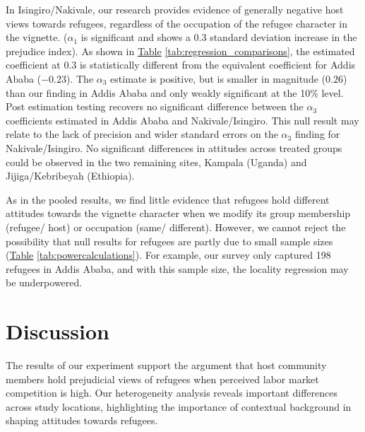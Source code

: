 \documentclass[a4paper,12pt]{article}
\begin{document}
In Isingiro/Nakivale, our research provides evidence of generally negative host views towards refugees, regardless of the occupation of the refugee character in the vignette. ($\alpha_{1}$ is significant and shows a $0.3$ standard deviation increase in the prejudice index). As shown in \hyperref[tab:regression_comparisons]{Table} \ref{tab:regression_comparisons}, the estimated coefficient at 0.3 is statistically different from the equivalent coefficient for Addis Ababa ($-0.23$). The $\alpha_{3}$ estimate is positive, but is smaller in magnitude ($0.26$) than our finding in Addis Ababa and only weakly significant at the 10\% level. Post estimation testing recovers no significant difference between the $\alpha_{3}$ coefficients estimated in Addis Ababa and Nakivale/Isingiro. This null result may relate to the lack of precision and wider standard errors on the $\alpha_{3}$ finding for Nakivale/Isingiro. No significant differences in attitudes across treated groups could be observed in the two remaining sites, Kampala (Uganda) and Jijiga/Kebribeyah (Ethiopia). 


As in the pooled results, we find little evidence that refugees hold different attitudes towards the vignette character when we modify its group membership (refugee/ host) or occupation (same/ different). However, we cannot reject the possibility that null results for refugees are partly due to small sample sizes (\hyperref[tab:powercalculations]{Table} \ref{tab:powercalculations}). For example, our survey only captured 198 refugees in Addis Ababa, and with this sample size, the locality regression may be underpowered.



\section{Discussion}


The results of our experiment support the argument that host community members hold prejudicial views of refugees when perceived labor market competition is high. Our heterogeneity analysis reveals important differences across study locations, highlighting the importance of contextual background in shaping attitudes towards refugees. 
\end{document}
